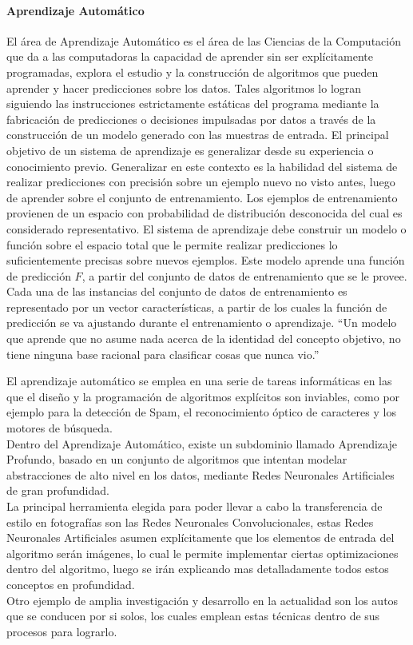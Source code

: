 \documentclass[a4paper,11pt,spanish]{book}
\begin{document}
    \paragraph{Aprendizaje Automático}
      El área de Aprendizaje Automático es el área de las Ciencias de la Computación que da a las computadoras la capacidad de aprender sin ser explícitamente programadas, explora el estudio
      y la construcción de algoritmos que pueden aprender y hacer predicciones sobre los datos. Tales algoritmos lo logran siguiendo las instrucciones estrictamente estáticas del programa
      mediante la fabricación de predicciones o decisiones impulsadas por datos a través de la construcción de un modelo generado con las muestras de entrada.
      El principal objetivo de un sistema de aprendizaje es generalizar desde su experiencia o conocimiento previo. Generalizar en este contexto es la habilidad del sistema de realizar
      predicciones con precisión sobre un ejemplo nuevo no visto antes, luego de aprender sobre el conjunto de entrenamiento. Los ejemplos de entrenamiento provienen de un espacio
      con probabilidad de distribución desconocida del cual es considerado representativo. El sistema de aprendizaje debe construir un modelo o función sobre el espacio total que le permite realizar
      predicciones lo suficientemente precisas sobre nuevos ejemplos. Este modelo aprende una función de predicción $F$, a partir del conjunto de datos de entrenamiento que se le provee.
      Cada una de las instancias del conjunto de datos de entrenamiento es representado por un vector características, a partir de los cuales la función de predicción
      se va ajustando durante el entrenamiento o aprendizaje.
      “Un modelo que aprende que no asume nada acerca de la identidad del concepto objetivo, no tiene ninguna base racional para clasificar cosas que nunca vio.” \cite{Mitchell:1997:ML:541177}

      El aprendizaje automático se emplea en una serie de tareas informáticas en las que el diseño y la programación de algoritmos explícitos son inviables, como por ejemplo para la detección de Spam, el reconocimiento
      óptico de caracteres y los motores de búsqueda.\\
      Dentro del Aprendizaje Automático, existe un subdominio llamado Aprendizaje Profundo, basado en un conjunto de algoritmos que intentan modelar abstracciones de alto nivel en los datos,
      mediante Redes Neuronales Artificiales de gran profundidad.\\
      La principal herramienta elegida para poder llevar a cabo la transferencia de estilo en fotografías son las Redes Neuronales Convolucionales, estas Redes Neuronales Artificiales asumen
      explícitamente que los elementos de  entrada del algoritmo serán imágenes, lo cual le permite implementar ciertas optimizaciones dentro del algoritmo, luego
      se irán explicando mas detalladamente todos estos conceptos en profundidad.\\
      Otro ejemplo de amplia investigación y desarrollo en la actualidad son los autos que se conducen por si solos, los cuales emplean estas técnicas dentro de sus procesos para lograrlo.
\end{document}
